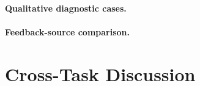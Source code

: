 \documentclass{article}
\begin{document}
\paragraph{Qualitative diagnostic cases.}

%
%


\paragraph{Feedback-source comparison.}

%
%





\section{Cross-Task Discussion}

%
%
%
%
%
%
%
%
%
\end{document}

